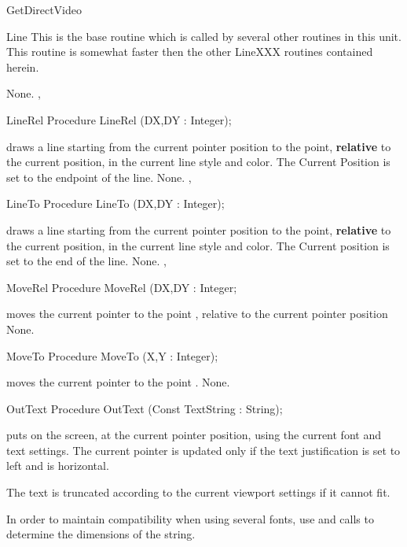 \begin{function}{GetDirectVideo}
\begin{procedure}{Line}
This is the base routine which is called by several other routines
in this unit. This routine is somewhat faster then the other
LineXXX routines contained herein.


\Errors
None.
\SeeAlso
{},
\end{procedure}
\begin{procedure}{LineRel}
\Declaration
Procedure LineRel (DX,DY : Integer);

\Description
{} draws a line starting from
the current pointer position to the point, \textbf{relative} to the
current position, in the current line style and color. The Current Position
is set to the endpoint of the line.
\Errors
None.
\SeeAlso
{}, 
\end{procedure}
\begin{procedure}{LineTo}
\Declaration
Procedure LineTo (DX,DY : Integer);

\Description
{} draws a line starting from
the current pointer position to the point, \textbf{relative} to the
current position, in the current line style and color. The Current position
is set to the end of the line.
\Errors
None.
\SeeAlso
{},
\end{procedure}
\begin{procedure}{MoveRel}
\Declaration
Procedure MoveRel (DX,DY : Integer;

\Description
{} moves the current pointer to the
point , relative to the current pointer
position
\Errors
None.
\SeeAlso
{}
\end{procedure}
\begin{procedure}{MoveTo}
\Declaration
Procedure MoveTo (X,Y : Integer);

\Description
{} moves the current pointer to the
point .
\Errors
None.
\SeeAlso
{}
\end{procedure}
\begin{procedure}{OutText}
\Declaration
Procedure OutText (Const TextString : String);

\Description
{} puts  on the screen, at the current pointer
position, using the current font and text settings. The current pointer is
updated only if the text justification is set to left and is horizontal.

The text is truncated according to the current viewport settings if it
cannot fit.

In order to maintain compatibility when using several fonts, use 
and  calls to determine the dimensions of the string.


\end{procedure}
\end{function}
